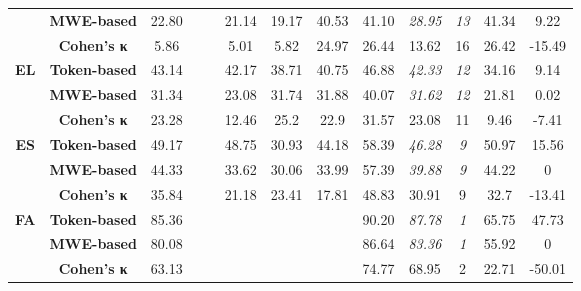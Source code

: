 \documentclass[output=paper,modfonts,nonflat,draftmode]{langsci/langscibook}
\begin{document}
\begin{table}
{\begin{tabular}{ccccccccccccc}
 & \textbf{\scriptsize{}MWE-based} & {\scriptsize{}22.80} &  &  & {\scriptsize{}21.14} & {\scriptsize{}19.17} & {\scriptsize{}40.53} & {\scriptsize{}41.10} & \emph{\scriptsize{}28.95} & \textit{\scriptsize{}13} & {\scriptsize{}41.34} & {\scriptsize{}9.22}\tabularnewline
  & \textbf{\scriptsize{}Cohen's κ} &\scriptsize{5.86}  &\scriptsize{}  &\scriptsize{}  & \scriptsize{5.01} &\scriptsize{5.82}  &\scriptsize{24.97}  &\scriptsize{26.44} &\scriptsize{13.62}  &\scriptsize{16} & \scriptsize{26.42} &\scriptsize{-15.49}  \tabularnewline
\midrule 
\textbf{\scriptsize{}EL} & \textbf{\scriptsize{}Token-based} & {\scriptsize{}43.14} &  &  & {\scriptsize{}42.17} & {\scriptsize{}38.71} & {\scriptsize{}40.75} & {\scriptsize{}46.88} & \emph{\scriptsize{}42.33} & \textit{\scriptsize{}12} & {\scriptsize{}34.16} & {\scriptsize{}9.14}\tabularnewline
 & \textbf{\scriptsize{}MWE-based} & {\scriptsize{}31.34} &  &  & {\scriptsize{}23.08} & {\scriptsize{}31.74} & {\scriptsize{}31.88} & {\scriptsize{}40.07} & \emph{\scriptsize{}31.62} & \textit{\scriptsize{}12} & {\scriptsize{}21.81} & {\scriptsize{}0.02}\tabularnewline
   & \textbf{\scriptsize{}Cohen's κ} &\scriptsize{23.28}  &\scriptsize{}  &\scriptsize{}  & \scriptsize{12.46} &\scriptsize{25.2}  &\scriptsize{22.9}  &\scriptsize{31.57} &\scriptsize{23.08}  &\scriptsize{11} & \scriptsize{9.46} &\scriptsize{-7.41}  \tabularnewline
\midrule 

\textbf{\scriptsize{}ES} & \textbf{\scriptsize{}Token-based} & {\scriptsize{}49.17} &  &  & {\scriptsize{}48.75} & {\scriptsize{}30.93} & {\scriptsize{}44.18} & {\scriptsize{}58.39} & \emph{\scriptsize{}46.28} & \textit{\scriptsize{}9} & {\scriptsize{}50.97} & {\scriptsize{}15.56}\tabularnewline
 & \textbf{\scriptsize{}MWE-based} & {\scriptsize{}44.33} &  &  & {\scriptsize{}33.62} & {\scriptsize{}30.06} & {\scriptsize{}33.99} & {\scriptsize{}57.39} & \emph{\scriptsize{}39.88} & \textit{\scriptsize{}9} & {\scriptsize{}44.22} & {\scriptsize{}0}\tabularnewline
   & \textbf{\scriptsize{}Cohen's κ} &\scriptsize{35.84}&\scriptsize{}  &\scriptsize{}  & \scriptsize{21.18} &\scriptsize{23.41}  &\scriptsize{17.81}  &\scriptsize{48.83} &\scriptsize{30.91}  &\scriptsize{9} & \scriptsize{32.7} &\scriptsize{-13.41}  \tabularnewline
\midrule 

\textbf{\scriptsize{}FA} & \textbf{\scriptsize{}Token-based} & {\scriptsize{}85.36} &  &  &  &  &  & {\scriptsize{}90.20} & \emph{\scriptsize{}87.78} & \textit{\scriptsize{}1} & {\scriptsize{}65.75} & {\scriptsize{}47.73}\tabularnewline
 & \textbf{\scriptsize{}MWE-based} & {\scriptsize{}80.08} &  &  &  &  &  & {\scriptsize{}86.64} & \emph{\scriptsize{}83.36} & \textit{\scriptsize{}1} & {\scriptsize{}55.92} & {\scriptsize{}0}\tabularnewline
    & \textbf{\scriptsize{}Cohen's κ} &\scriptsize{63.13} &\scriptsize{}  &\scriptsize{}  & \scriptsize{} &\scriptsize{}  &\scriptsize{}  &\scriptsize{74.77} &\scriptsize{68.95}  &\scriptsize{2} & \scriptsize{22.71} &\scriptsize{-50.01}  \tabularnewline
\midrule 


\end{tabular}}
\end{table}
\end{document}
